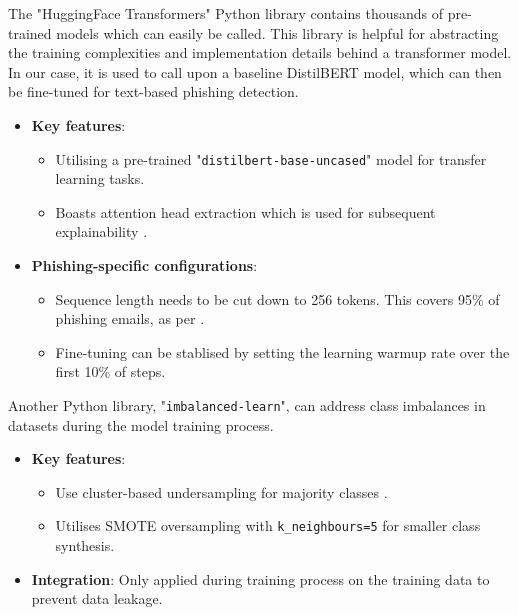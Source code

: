\noindent The "HuggingFace Transformers" Python library contains thousands of pre-trained models which can easily be called. This library is helpful for abstracting the training complexities and implementation details behind a transformer model. In our case, it is used to call upon a baseline DistilBERT model, which can then be fine-tuned for text-based phishing detection.

\begin{itemize}
  \item \textbf{Key features}:
  \begin{itemize}
    \item Utilising a pre-trained "\texttt{distilbert-base-uncased}" model for transfer learning tasks.
    \item Boasts attention head extraction which is used for subsequent explainability \citep{vo2024securing}.
  \end{itemize}
  \item \textbf{Phishing-specific configurations}:
  \begin{itemize}
    \item Sequence length needs to be cut down to 256 tokens. This covers 95\% of phishing emails, as per \cite{sanchez2022phishing}.
    \item Fine-tuning can be stablised by setting the learning warmup rate over the first 10\% of steps.
  \end{itemize}
\end{itemize}

\noindent Another Python library, "\texttt{imbalanced-learn}", can address class imbalances in datasets during the model training process.

\begin{itemize}
  \item \textbf{Key features}:
  \begin{itemize}
    \item Use cluster-based undersampling for majority classes \citep{zamir2020phishing}.
    \item Utilises SMOTE oversampling with \texttt{k\_neighbours=5} for smaller class synthesis.
  \end{itemize}
  \item \textbf{Integration}: Only applied during training process on the training data to prevent data leakage.
\end{itemize}
